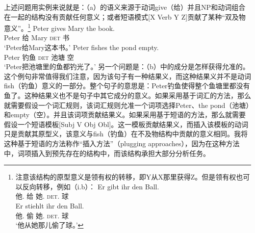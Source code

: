 上述问题用实例来说就是：（a）的语义来源于动词give（给）并且NP和动词组合在一起的结构没有贡献任何意义；或者短语模式[X Verb Y Z]贡献了某种“双及物意义”。\footnote{%
注意该结构的原型意义是领有权的转移，即Y从X那里获得Z。但是领有权也可以反向转移，例如（i.b）：
\eal
\ex 
\gll Er gibt ihr den Ball.\\
     他.\nom{} 给 她.\dat{} \textsc{det}.\acc{} 球\\
\ex
\gll Er stiehlt ihr den Ball.\\
     他.\nom{} 偷  她.\dat{} \textsc{det}.\acc{} 球\\
\glt `他从她那儿偷了球。'
\zllast
}
\eal
\ex 
\gll Peter gives Mary the book.\\
      Peter 给 Mary \textsc{det} 书\\
\glt `Peter给Mary这本书。'      
\ex 
\gll Peter fishes the pond empty.\\
Peter 钓鱼 \textsc{det} 池塘 空\\
\glt `Peter把池塘里的鱼都钓光了。'   
\zl
另一个问题是：（b）中的成分是怎样获得允准的。这个例句非常值得我们注意，因为该句子有一种结果义，而这种结果义并不是动词fish（钓鱼）意义的一部分。整个句子的意思是：Peter钓鱼使得整个鱼塘里都没有鱼了。这种结果义也不是句子中其它成分的意义。如果采用基于词汇的方法，那么就需要假设一个词汇规则，该词汇规则允准一个词项选择Peter、the pond（池塘）和empty（空）。并且该词项贡献结果义。如果采用基于短语的方法，那么就需要假设一个短语模板[Subj V Obj Obl]。这一模板贡献结果义，而插入该模板的动词只是贡献其原型义，该意义与fish（钓鱼）在不及物结构中贡献的意义相同。我将这种基于短语的方法称作“插入方法”（plugging approaches），因为在这种方法中，词项插入到预先存在的结构中，而该结构承担大部分分析任务。
